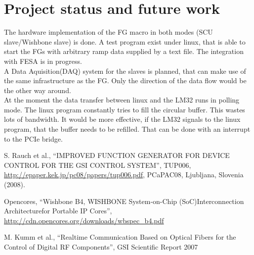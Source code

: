 \documentclass[a4paper,
              ]{jacow}
\begin{document}
\section{Project status and future work}
The hardware implementation of the FG macro in both modes (SCU slave/Wishbone slave) is done. A test program exist under linux, that is able to start the FGs with arbitrary ramp data supplied by a text file. The integration with FESA is in progress.\\
A Data Aquisition(DAQ) system for the slaves is planned, that can make use of the same infrastructure as the FG. Only the direction of the data flow would be the other way around.\\ 
At the moment the data transfer between linux and the LM32 runs in polling mode. The linux program constantly tries to fill the circular buffer. This wastes lots of bandwidth. It would be more effective, if the LM32 signals to the linux program, that the buffer needs to be refilled. That can be done with an interrupt to the PCIe bridge.


%
%
\iftrue   %
	\raggedend
\fi


\iffalse  %
	\newpage
	\printbibliography

\else
\begin{thebibliography}{9}   %

    S. Rauch et al., ``IMPROVED FUNCTION GENERATOR FOR
	 DEVICE CONTROL FOR THE GSI CONTROL SYSTEM'',
    TUP006, \url{http://epaper.kek.jp/pc08/papers/tup006.pdf}, PCaPAC08, Ljubljana, Slovenia (2008).

	Opencores, ``Wishbone B4, WISHBONE System-on-Chip (SoC)Interconnection
	Architecturefor Portable IP Cores'', 
	\url{http://cdn.opencores.org/downloads/wbspec_b4.pdf}

  M. Kumm et al., ``Realtime Communication Based on Optical Fibers for the Control of Digital RF Components'', 
  GSI Scientific Report 2007

\end{thebibliography}
\fi
\end{document}
